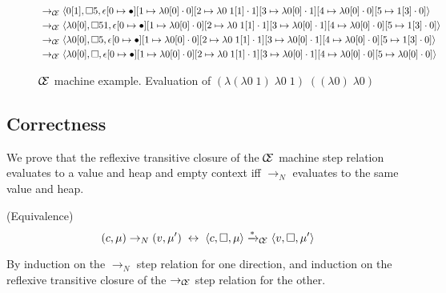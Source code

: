 \begin{figure}
\begin{align*}
&\rightarrow_{\mathcal{\mathcal{C} \mskip -4mu \mathcal{E}}}\langle 0[1],\square 5,\epsilon[0\mapsto\bullet][1\mapsto\lambda0[0]\cdot0][2\mapsto\lambda0\;1[1]\cdot1][3\mapsto\lambda0[0]\cdot1][4\mapsto\lambda0[0]\cdot0][5\mapsto1[3]\cdot0]\rangle\\ 
&\rightarrow_{\mathcal{\mathcal{C} \mskip -4mu \mathcal{E}}}\langle \lambda0[0],\square 5 1,\epsilon[0\mapsto\bullet][1\mapsto\lambda0[0]\cdot0][2\mapsto\lambda0\;1[1]\cdot1][3\mapsto\lambda0[0]\cdot1][4\mapsto\lambda0[0]\cdot0][5\mapsto1[3]\cdot0]\rangle\\ 
&\rightarrow_{\mathcal{\mathcal{C} \mskip -4mu \mathcal{E}}}\langle \lambda0[0],\square 5,\epsilon[0\mapsto\bullet][1\mapsto\lambda0[0]\cdot0][2\mapsto\lambda0\;1[1]\cdot1][3\mapsto\lambda0[0]\cdot1][4\mapsto\lambda0[0]\cdot0][5\mapsto1[3]\cdot0]\rangle\\ 
&\rightarrow_{\mathcal{\mathcal{C} \mskip -4mu \mathcal{E}}}\langle \lambda0[0],\square,\epsilon[0\mapsto\bullet][1\mapsto\lambda0[0]\cdot0][2\mapsto\lambda0\;1[1]\cdot1][3\mapsto\lambda0[0]\cdot1][4\mapsto\lambda0[0]\cdot0][5\mapsto\lambda0[0]\cdot0]\rangle\\ 
\end{align*}
\caption{$\mathcal{\mathcal{C} \mskip -4mu \mathcal{E}}$ machine example.
Evaluation of $(\lambda(\lambda0\;1)\;\lambda0\;1)\;((\lambda0)\;\lambda0)$}
\label{fig:state}
\end{figure}

\subsection{Correctness}
We prove that the reflexive transitive closure of the $\mathcal{\mathcal{C} \mskip -4mu \mathcal{E}}$ machine
step relation evaluates to a value and heap and empty context iff
$\xrightarrow{}_{N}$ evaluates to the same value and heap.

{\thm \textnormal{(Equivalence)} $$(c, \mu) \rightarrow_{N} (v, \mu') \;
\leftrightarrow \; \langle c, \square, \mu \rangle \xrightarrow{*
}_{\mathcal{\mathcal{C} \mskip -4mu \mathcal{E}}} \langle v, \square, \mu' \rangle $$} 

By induction on the $\rightarrow_{N}$ step relation for one direction, and
induction on the reflexive transitive closure of the
$\rightarrow_{\mathcal{\mathcal{C} \mskip -4mu \mathcal{E}}}$ step relation for
the other.

